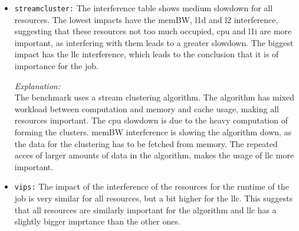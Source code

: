 \begin{enumerate}
\begin{enumerate}
\begin{itemize}
            \textit{Explanation:} %
            \\ The radix benchmark sorts integers using the radix sort algorithm. The low impact of interference with memBW and low level caches can be explained by the structured data access of the algorithm of large arrays. As large arrays of data are repeatedly read and accessed, the llc is important for keeping the information cached, slowing the job down when interfering with it. 

            \item \texttt{streamcluster:} %
            The interference table shows medium slowdown for all resources. The lowest impacts have the memBW, l1d and l2 interference, suggesting that these resources not too much occupied, cpu and l1i are more important, as interfering with them leads to a greater slowdown. The biggest impact has the llc interference, which leads to the conclusion that it is of importance for the job.
            
            \textit{Explanation:} %
            \\ The benchmark uses a stream clustering algorithm. The algorithm has mixed workload between computation and memory and cache usage, making all resources important. The cpu slowdown is due to the heavy computation of forming the clusters. memBW interference is slowing the algorithm down, as the data for the clustering has to be fetched from memory. The repeated acces of larger amounts of data in the algorithm, makes the usage of llc more important.

            \item \texttt{vips:} %
            The impact of the interference of the resources for the runtime of the job is very similar for all resources, but a bit higher for the llc. This suggests that all resources are similarly important for the algorithm and llc has a slightly bigger imprtance than the other ones.


\end{itemize}
\end{enumerate}
\end{enumerate}
